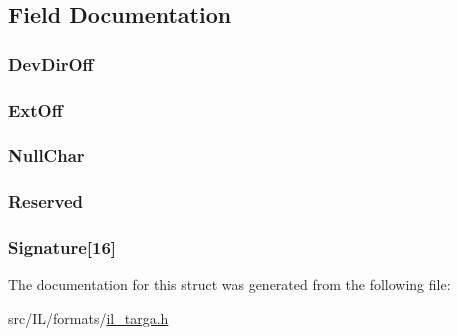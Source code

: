 \subsection{Field Documentation}
\hypertarget{struct_t_a_r_g_a_f_o_o_t_e_r_a44a48dc5d2dd7652d60d1a7226569d87}{
\subsubsection[{Dev\-Dir\-Off}]{ Dev\-Dir\-Off}}\label{struct_t_a_r_g_a_f_o_o_t_e_r_a44a48dc5d2dd7652d60d1a7226569d87}
\hypertarget{struct_t_a_r_g_a_f_o_o_t_e_r_a24ce44fbc10df1024a27d4133ae36146}{
\subsubsection[{Ext\-Off}]{ Ext\-Off}}\label{struct_t_a_r_g_a_f_o_o_t_e_r_a24ce44fbc10df1024a27d4133ae36146}
\hypertarget{struct_t_a_r_g_a_f_o_o_t_e_r_aa1098a73cd62788d2271cf8d4aa1ead0}{
\subsubsection[{Null\-Char}]{ Null\-Char}}\label{struct_t_a_r_g_a_f_o_o_t_e_r_aa1098a73cd62788d2271cf8d4aa1ead0}
\hypertarget{struct_t_a_r_g_a_f_o_o_t_e_r_ab6150438e6c8472cf5a30cea85596dcf}{
\subsubsection[{Reserved}]{ Reserved}}\label{struct_t_a_r_g_a_f_o_o_t_e_r_ab6150438e6c8472cf5a30cea85596dcf}
\hypertarget{struct_t_a_r_g_a_f_o_o_t_e_r_af0dd63484b3bd69b4320574ee76724a1}{
\subsubsection[{Signature}]{ Signature\mbox{[}16\mbox{]}}}\label{struct_t_a_r_g_a_f_o_o_t_e_r_af0dd63484b3bd69b4320574ee76724a1}


The documentation for this struct was generated from the following file\-:\begin{DoxyCompactItemize}
\item 
src/\-I\-L/formats/\hyperlink{il__targa_8h}{il\-\_\-targa.\-h}\end{DoxyCompactItemize}

